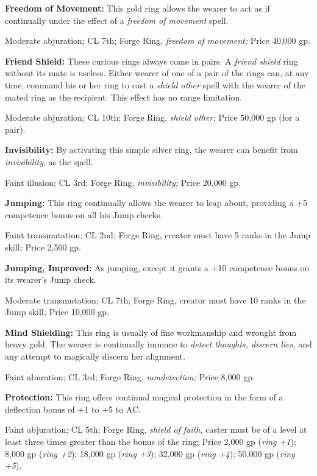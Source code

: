 \documentclass{article}
\begin{document}
\textbf{Freedom of Movement:} This gold ring allows the wearer to act as if continually 
under the effect of a \textit{freedom of movement }spell.

Moderate abjuration; CL 7th; Forge Ring, \textit{freedom of movement; }Price 40,000 
gp.

\textbf{Friend Shield:} These curious rings always come in pairs. A \textit{friend 
shield }ring without its mate is useless. Either wearer of one of a pair of the 
rings can, at any time, command his or her ring to cast a \textit{shield other 
}spell with the wearer of the mated ring as the recipient. This effect has no range 
limitation. 

Moderate abjuration; CL 10th; Forge Ring, \textit{shield other; }Price 50,000 gp 
(for a pair).

\textbf{Invisibility:} By activating this simple silver ring, the wearer can benefit 
from \textit{invisibility}, as the spell.

Faint illusion; CL 3rd; Forge Ring, \textit{invisibility; }Price 20,000 gp.

\textbf{Jumping:} This ring continually allows the wearer to leap about, providing 
a +5 competence bonus on all his Jump checks.

Faint transmutation; CL 2nd; Forge Ring, creator must have 5 ranks in the Jump 
skill\textit{; }Price 2,500 gp.

\textbf{Jumping, Improved:} As jumping, except it grants a +10 competence bonus 
on its wearer's Jump check.

Moderate transmutation; CL 7th; Forge Ring, creator must have 10 ranks in the Jump 
skill\textit{; }Price 10,000 gp.

\textbf{Mind Shielding:} This ring is usually of fine workmanship and wrought from 
heavy gold. The wearer is continually immune to \textit{detect thoughts, discern 
lies, }and any attempt to magically discern her alignment\textit{.}

Faint aburation; CL 3rd; Forge Ring, \textit{nondetection; }Price 8,000 gp.

\textbf{Protection:} This ring offers continual magical protection in the form 
of a deflection bonus of +1 to +5 to AC.

Faint abjuration; CL 5th; Forge Ring, \textit{shield of faith, }caster must be 
of a level at least three times greater than the bonus of the ring; Price 2,000 
gp (\textit{ring +1}); 8,000 gp (\textit{ring +2}); 18,000 gp (\textit{ring +3}); 
32,000 gp (\textit{ring +4}); 50,000 gp (\textit{ring +5}).
\end{document}
